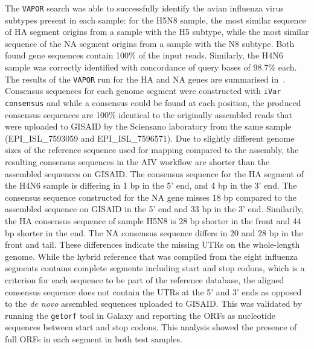 The \texttt{VAPOR} search was able to successfully identify the avian influenza virus subtypes present in each sample: for the H5N8 sample, the most similar sequence of HA segment origins from a sample with the H5 subtype, while the most similar sequence of the NA segment origins from a sample with the N8 subtype. Both found gene sequences contain 100\% of the input reads. Similarly, the H4N6 sample was correctly identified with concordance of query bases of 98.7\% each. The results of the \texttt{VAPOR} run for the HA and NA genes are summarised in~. \\
Consensus sequences for each genome segment were constructed with \texttt{iVar consensus} and while a consensus could be found at each position, the produced consensus sequences are 100\% identical to the originally assembled reads that were uploaded to \ac{GISAID} by the Sciensano laboratory from the same sample (EPI\_ISL\_7593059 and EPI\_ISL\_7596571). Due to slightly different genome sizes of the reference sequence used for mapping compared to the assembly, the resulting consensus sequences in the \ac{AIV} workflow are shorter than the assembled sequences on \ac{GISAID}. The consensus sequence for the \ac{HA} segment of the H4N6 sample is differing in 1 bp in the 5' end, and 4 bp in the 3' end. The consensus sequence constructed for the \ac{NA} gene misses 18 bp compared to the assembled sequence on \ac{GISAID} in the 5' end and 33 bp in the 3' end. Similarily, the \ac{HA} consensus sequence of sample H5N8 is 28 bp shorter in the front and 44 bp shorter in the end. The \ac{NA} consensus sequence differs in 20 and 28 bp in the front and tail. These differences indicate the missing \acp{UTR} on the whole-length genome. While the hybrid reference that was compiled from the eight influenza segments contains complete segments including start and stop codons, which is a criterion for each sequence to be part of the reference database, the aligned consensus sequence does not contain the \acp{UTR} at the 5' and 3' ends as opposed to the \textit{de novo} assembled sequences uploaded to \ac{GISAID}. This was validated by running the \texttt{getorf} tool in Galaxy and reporting the \acp{ORF} as nucleotide sequences between start and stop codons. This analysis showed the presence of full \acp{ORF} in each segment in both test samples.
\\
